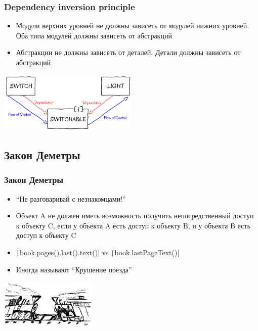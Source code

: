 \documentclass{../../slides-style}
\begin{document}
    \begin{frame}
        \frametitle{Dependency inversion principle}
        \begin{itemize}
            \item Модули верхних уровней не должны зависеть от модулей нижних уровней. Оба типа модулей должны зависеть от абстракций
            \item Абстракции не должны зависеть от деталей. Детали должны зависеть от абстракций
        \end{itemize}
        \begin{flushright}
            \includegraphics[width=0.5\textwidth]{dependencyInversionPrinciple.png}
        \end{flushright}
    \end{frame}

    \subsection{Закон Деметры}

    \begin{frame}
        \frametitle{Закон Деметры}
        \begin{itemize}
            \item \enquote{Не разговаривай с незнакомцами!}
            \item Объект A не должен иметь возможность получить непосредственный доступ к объекту C, если у объекта A есть доступ к объекту B, и у объекта B есть доступ к объекту C
            \item \texttt|book.pages().last().text()| vs \texttt|book.lastPageText()|
            \item Иногда называют \enquote{Крушение поезда}
        \end{itemize}
        \begin{flushright}
            \includegraphics[width=0.35\textwidth]{trains.png}
        \end{flushright}
        \vspace{-0.8cm}
    \end{frame}
\end{document}
